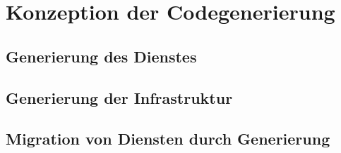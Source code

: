 \chapter{Konzeption der Codegenerierung}

\section{Generierung des Dienstes}

\section{Generierung der Infrastruktur}

\section{Migration von Diensten durch Generierung}